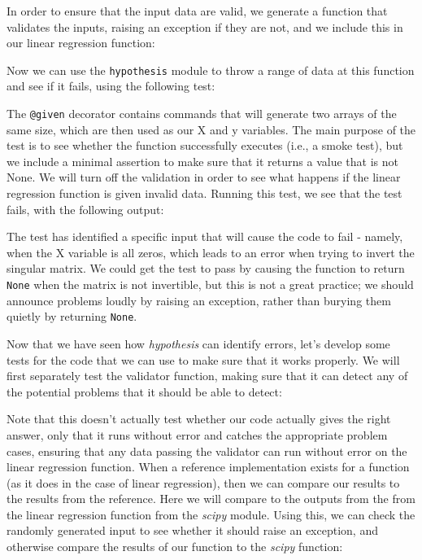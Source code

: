 In order to ensure that the input data are valid, we generate a function that validates the inputs, raising an exception if they are not, and we include this in our linear regression function:



Now we can use the \texttt{hypothesis} module to throw a range of data at this function and see if it fails, using the following test:



The \texttt{@given} decorator contains commands that will generate two arrays of the same size, which are then used as our X and y variables.
The main purpose of the test is to see whether the function successfully executes (i.e., a smoke test), but we include a minimal assertion to make sure that it returns a value that is not None.
We will turn off the validation in order to see what happens if the linear regression function is given invalid data.
Running this test, we see that the test fails, with the following output:



The test has identified a specific input that will cause the code to fail - namely, when the X variable is all zeros, which leads to an error when trying to invert the singular matrix.
We could get the test to pass by causing the function to return \texttt{None} when the matrix is not invertible, but this is not a great practice; we should announce problems loudly by raising an exception, rather than burying them quietly by returning \texttt{None}.

Now that we have seen how \textit{hypothesis} can identify errors, let's develop some tests for the code that we can use to make sure that it works properly.
We will first separately test the validator function, making sure that it can detect any of the potential problems that it should be able to detect:



Note that this doesn't actually test whether our code actually gives the right answer, only that it runs without error and catches the appropriate problem cases, ensuring that any data passing the validator can run without error on the linear regression function.
When a reference implementation exists for a function (as it does in the case of linear regression), then we can compare our results to the results from the reference.
Here we will compare to the outputs from the from the linear regression function from the \textit{scipy} module.
Using this, we can check the randomly generated input to see whether it should raise an exception, and otherwise compare the results of our function to the \textit{scipy} function:

